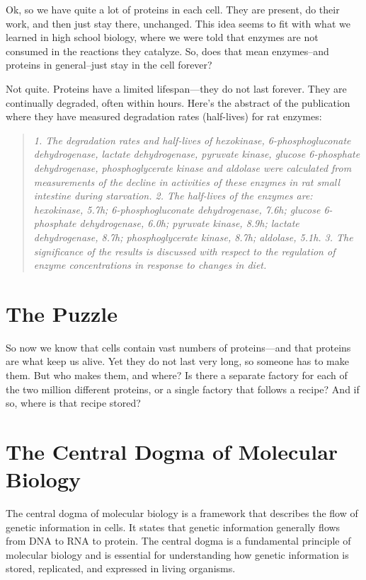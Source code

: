 Ok, so we have quite a lot of proteins in each cell. They are present, do their work, and then just stay there, unchanged. This idea seems to fit with what we learned in high school biology, where we were told that enzymes are not consumed in the reactions they catalyze. So, does that mean enzymes--and proteins in general--just stay in the cell forever?

Not quite. Proteins have a limited lifespan—they do not last forever. They are continually degraded, often within hours. Here's the abstract of the publication where they have measured degradation rates (half-lives) for rat enzymes:

\begin{quote}
    \textit{1. The degradation rates and half-lives of hexokinase, 6-phosphogluconate dehydrogenase, lactate dehydrogenase, pyruvate kinase, glucose 6-phosphate dehydrogenase, phosphoglycerate kinase and aldolase were calculated from measurements of the decline in activities of these enzymes in rat small intestine during starvation. 2. The half-lives of the enzymes are: hexokinase, 5.7h; 6-phosphogluconate dehydrogenase, 7.6h; glucose 6-phosphate dehydrogenase, 6.0h; pyruvate kinase, 8.9h; lactate dehydrogenase, 8.7h; phosphoglycerate kinase, 8.7h; aldolase, 5.1h. 3. The significance of the results is discussed with respect to the regulation of enzyme concentrations in response to changes in diet.}
\end{quote}

\section{The Puzzle}

So now we know that cells contain vast numbers of proteins—and that proteins are what keep us alive. Yet they do not last very long, so someone has to make them. But who makes them, and where? Is there a separate factory for each of the two million different proteins, or a single factory that follows a recipe? And if so, where is that recipe stored?

\section{The Central Dogma of Molecular Biology}

The central dogma 
of molecular biology is a framework that describes the flow of genetic information in cells. It states that genetic information generally flows from DNA to RNA to protein. The central dogma is a fundamental principle of molecular biology and is essential for understanding how genetic information is stored, replicated, and expressed in living organisms.


